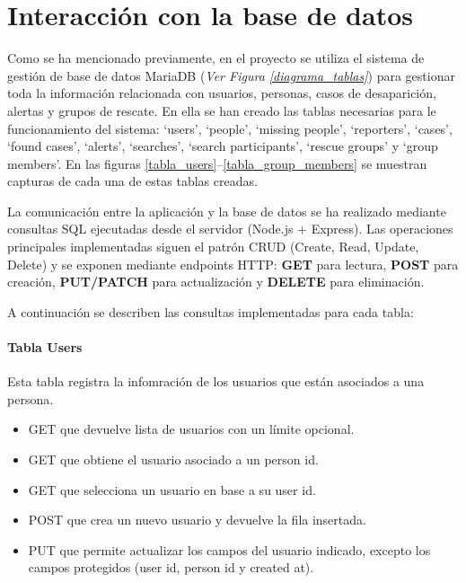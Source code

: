 \chapter{Interacción con la base de datos} \label{Anexo:InteraccionBBDD}

    Como se ha mencionado previamente, en el proyecto se utiliza el sistema de gestión de base de datos MariaDB (\textit{Ver Figura \ref{diagrama_tablas}}) para gestionar toda la información relacionada con usuarios, personas, casos de desaparición, alertas y grupos de rescate. En ella se han creado las tablas necesarias para le funcionamiento del sistema: `users', `people', `missing people', `reporters', `cases', `found cases', `alerts', `searches', `search participants', `rescue groups' y `group members'. En las figuras \ref{tabla_users}--\ref{tabla_group_members} se muestran capturas de cada una de estas tablas creadas.

    La comunicación entre la aplicación y la base de datos se ha realizado mediante consultas SQL ejecutadas desde el servidor (Node.js + Express). Las operaciones principales implementadas siguen el patrón CRUD (Create, Read, Update, Delete) y se exponen mediante endpoints HTTP: \textbf{GET} para lectura, \textbf{POST} para creación, \textbf{PUT/PATCH} para actualización y \textbf{DELETE} para eliminación.

    A continuación se describen las consultas implementadas para cada tabla:

    \subsubsection{Tabla Users}
    Esta tabla registra la infomración de los usuarios que están asociados a una persona.
    \begin{itemize}
            \item GET que devuelve lista de usuarios con un límite opcional.
            \item GET que obtiene el usuario asociado a un person id.
            \item GET que selecciona un usuario en base a su user id. 
            \item POST que crea un nuevo usuario y devuelve la fila insertada. 
            \item PUT que permite actualizar los campos del usuario indicado, excepto los campos protegidos (user id, person id y created at).   
    \end{itemize}

